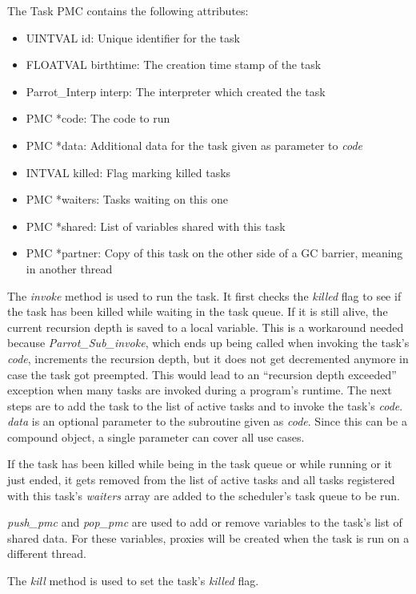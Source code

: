 \documentclass[bachelor,english]{hgbthesis}
\begin{document}
The Task PMC contains the following attributes:
%
\begin{itemize}
\item UINTVAL id: Unique identifier for the task
\item FLOATVAL birthtime: The creation time stamp of the task
\item Parrot\_Interp interp: The interpreter which created the task
\item PMC *code: The code to run
\item PMC *data: Additional data for the task given as parameter to \textit{code}
\item INTVAL killed: Flag marking killed tasks
\item PMC *waiters: Tasks waiting on this one
\item PMC *shared: List of variables shared with this task
\item PMC *partner: Copy of this task on the other side of a GC barrier, meaning in another thread
\end{itemize}

The \textit{invoke} method is used to run the task. It first checks the \textit{killed} flag to see if the task has been killed while waiting in the task queue. If it is still alive, the current recursion depth is saved to a local variable. This is a workaround needed because \textit{Parrot\_Sub\_invoke}, which ends up being called when invoking the task's \textit{code}, increments the recursion depth, but it does not get decremented anymore in case the task got preempted. This would lead to an ``recursion depth exceeded'' exception when many tasks are invoked during a program's runtime. The next steps are to add the task to the list of active tasks and to invoke the task's \textit{code}. \textit{data} is an optional parameter to the subroutine given as \textit{code}. Since this can be a compound object, a single parameter can cover all use cases.

If the task has been killed while being in the task queue or while running or it just ended, it gets removed from the list of active tasks and all tasks registered with this task's \textit{waiters} array are added to the scheduler's task queue to be run.

\textit{push\_pmc} and \textit{pop\_pmc} are used to add or remove variables to the task's list of shared data. For these variables, proxies will be created when the task is run on a different thread.

The \textit{kill} method is used to set the task's \textit{killed} flag.
\end{document}

